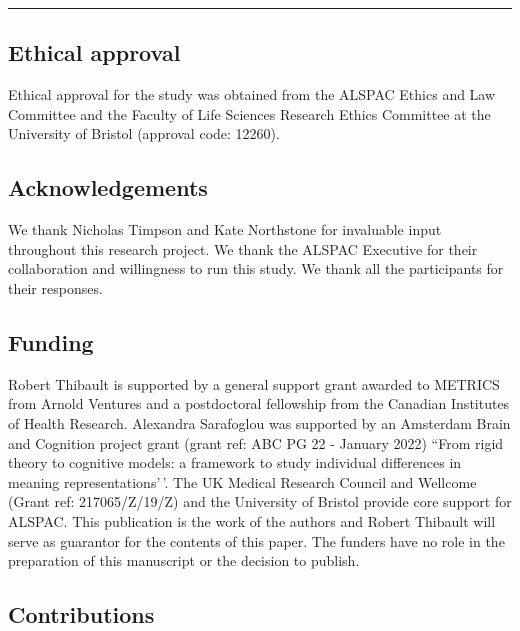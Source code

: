 \documentclass[
  man,floatsintext]{apa6}
\begin{document}
\begin{center}\rule{0.5\linewidth}{0.5pt}\end{center}

\hypertarget{ethical-approval}{%
\subsection{Ethical approval}\label{ethical-approval}}

Ethical approval for the study was obtained from the ALSPAC Ethics and Law Committee and the Faculty of Life Sciences Research Ethics Committee at the University of Bristol (approval code: 12260).

\hypertarget{acknowledgements}{%
\subsection{Acknowledgements}\label{acknowledgements}}

We thank Nicholas Timpson and Kate Northstone for invaluable input throughout this research project. We thank the ALSPAC Executive for their collaboration and willingness to run this study. We thank all the participants for their responses.

\hypertarget{funding}{%
\subsection{Funding}\label{funding}}

Robert Thibault is supported by a general support grant awarded to METRICS from Arnold Ventures and a postdoctoral fellowship from the Canadian Institutes of Health Research. Alexandra Sarafoglou was supported by an Amsterdam Brain and Cognition project grant (grant ref: ABC PG 22 - January 2022) ``From rigid theory to cognitive models: a framework to study individual differences in meaning representations'\,'. The UK Medical Research Council and Wellcome (Grant ref: 217065/Z/19/Z) and the University of Bristol provide core support for ALSPAC. This publication is the work of the authors and Robert Thibault will serve as guarantor for the contents of this paper. The funders have no role in the preparation of this manuscript or the decision to publish.

\hypertarget{contributions}{%
\subsection{Contributions}\label{contributions}}
\end{document}
